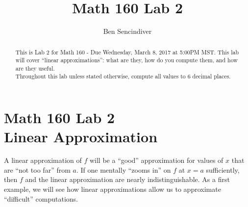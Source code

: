 \documentclass[handout,nooutcomes]{ximera}
\title{Math 160 Lab 2}
\author{Ben Sencindiver} %
\begin{document}
\section{Math 160 Lab 2 \\ Linear Approximation}

\begin{abstract}
This is Lab 2 for Math 160 - Due Wednesday, March 8, 2017 at 5:00PM MST.
This lab will cover ``linear approximations'': what are they,
how do you compute them, and how are they useful.\\

Throughout this lab unless stated otherwise, compute all values to $6$ decimal places.
\end{abstract}

\maketitle


A linear approximation of $f$ will be a ``good'' approximation for values of
$x$ that are ``not too far'' from $a$.
If one mentally ``zooms in'' on $f$ at $x=a$ sufficiently, then $f$ and the linear
approximation are nearly indistinguishable. As a first example, we
will see how linear approximations allow us to approximate
``difficult'' computations.
\end{document}
